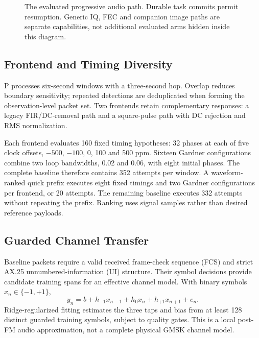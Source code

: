 \documentclass[journal]{IEEEtran}
\begin{document}
\begin{figure}[t]
\centering
{}
\caption{The evaluated progressive audio path. Durable task commits permit resumption. Generic IQ, FEC and companion image paths are separate capabilities, not additional evaluated arms hidden inside this diagram.}
\label{fig:architecture}
\end{figure}

\subsection{Frontend and Timing Diversity}
P processes six-second windows with a three-second hop. Overlap reduces boundary sensitivity; repeated detections are deduplicated when forming the observation-level packet set. Two frontends retain complementary responses: a legacy FIR/DC-removal path and a square-pulse path with DC rejection and RMS normalization.

Each frontend evaluates 160 fixed timing hypotheses: 32 phases at each of five clock offsets, $-500$, $-100$, 0, 100 and 500 ppm. Sixteen Gardner configurations combine two loop bandwidths, 0.02 and 0.06, with eight initial phases. The complete baseline therefore contains 352 attempts per window. A waveform-ranked quick prefix executes eight fixed timings and two Gardner configurations per frontend, or 20 attempts. The remaining baseline executes 332 attempts without repeating the prefix. Ranking uses signal samples rather than desired reference payloads.

\subsection{Guarded Channel Transfer}
Baseline packets require a valid received frame-check sequence (FCS) and strict AX.25 unnumbered-information (UI) structure. Their symbol decisions provide candidate training spans for an effective channel model. With binary symbols $x_n\in\{-1,+1\}$,
\begin{equation}
y_n=b+h_{-1}x_{n-1}+h_0x_n+h_{+1}x_{n+1}+e_n.
\label{eq:channel}
\end{equation}
Ridge-regularized fitting estimates the three taps and bias from at least 128 distinct guarded training symbols, subject to quality gates. This is a local post-FM audio approximation, not a complete physical GMSK channel model.
\end{document}
